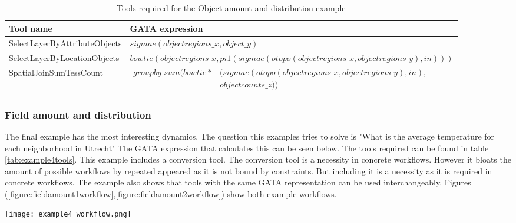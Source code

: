 \documentclass{article}
\begin{document}
\begin{table}[h]
    \centering
    \begin{tabular}{|l|l|}
        \hline
        Tool name & GATA expression  \\
        \hline

        SelectLayerByAttributeObjects & $sigmae (objectregions\_x, object\_y)$\\
        \hline
        SelectLayerByLocationObjects & $bowtie (objectregions\_x, pi1 (sigmae (otopo (objectregions\_x, objectregions\_y), in) ) )$\\
        \hline
        SpatialJoinSumTessCount & $\begin{array} {lcl} groupby\_sum (bowtie* &(sigmae (otopo (objectregions\_x,objectregions\_y),in),\\ &   objectcounts\_z)) \end{array}$\\
        \hline
    \end{tabular}
    \caption{Tools required for the Object amount and distribution example}
    \label{tab:example3tools}
\end{table}

\subsubsection{Field amount and distribution}
The final example has the most interesting dynamics. The question this examples tries to solve is "What is the average temperature for each neighborhood in Utrecht" The GATA expression that calculates this can be seen below. The tools required can be found in table \ref{tab:example4tools}. 
This example includes a conversion tool. The conversion tool is a necessity in concrete workflows. However it bloats the amount of possible workflows by repeated appeared as it is not bound by constraints. But including it is a necessity as it is required in concrete workflows. 
The example also shows that tools with the same GATA representation can be used interchangeably. Figures (\ref{figure:fieldamount1workflow},\ref{figure:fieldamount2workflow}) show both example workflows. 

    \begin{sidewaysfigure}
  \centering
   \texttt{[image: example4\_workflow.png]}
    \caption{The given workflow for the Object amount and distribution example }
    \label{figure:fieldamount1workflow}
\end{sidewaysfigure}
\end{document}
